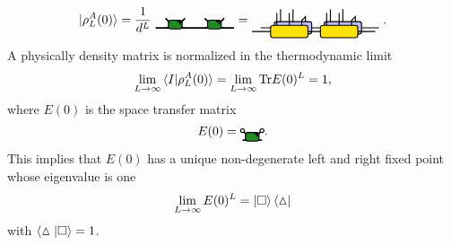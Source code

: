 \documentclass[aps,prx,twocolumn,notitlepage,nofootinbib,nobalancelastpage]{revtex4-2}
\theoremstyle{break}
\newcommand{\1}{\mathbbm{1}}
\theoremstyle{plain}
\theoremstyle{plain}
\theoremstyle{plain}
\newcommand{\MYcircle}[2]{
\draw[thick, fill=white] (#1,#2) circle (0.1cm); }
\newcommand{\rhoO}[2]{
\draw[very thick] (-.5+#1,0.5+#2) -- (#1,0+#2);
\draw[very thick] (#1,0+#2) -- (.5+#1,0.5+#2);
\draw[very thick] (-.5+#1,#2) -- (.5+#1,#2);
\draw[ thick, fill=mygreen, rounded corners=2pt] (-0.35+#1,0.2-0.25+#2) rectangle (0.35+#1,0.2+0.2+#2);
\draw[very thick] (0.1+#1,0.15+.18+#2)-- (.15+0.1+#1,0.15+.18+#2) -- (.15+0.1+#1,0+.18+#2);
}
\begin{document}
\begin{equation}
\ket{\rho_L^A(0)}=\frac{1}{d^L} \;
\begin{tikzpicture}[baseline=(current bounding box.center), scale=0.55]
\draw[very thick] (-1.0 ,0.) -- (3.0,0.);
\rhoO{0}{0}\rhoO{2}{0}
\end{tikzpicture}
=
\begin{tikzpicture}[baseline=(current  bounding  box.center), scale=.7]
\def\dx{0.15}
\def\dy{0.15}
\draw[ thick] (-4.75+.2+\dx,0.+\dy) --(-0.0+0.2+\dx,0.+\dy);
%
\draw[ thick] (-3.75+\dx,0.75+\dy) -- (-3.75+\dx,-0.0+\dy);
\draw[ thick] (-3.25+\dx,0.75+\dy) -- (-3.25+\dx,0.0+\dy);
\draw[ thick, fill=myblue, rounded corners=2pt] (-4+\dx,0.25+\dy) rectangle (-2.5+\dx,-0.25+\dy);
\draw[ thick] (-1.75+\dx,0.75+\dy) -- (-1.75+\dx,-0.0+\dy);
\draw[ thick] (-1.25+\dx,0.75+\dy) -- (-1.25+\dx,0.0+\dy);
\draw[ thick, fill=myblue, rounded corners=2pt] (-2+\dx,0.25+\dy) rectangle (-0.5+\dx,-0.25+\dy);
\draw[ thick] (-2.75 ,0.25) -- (-2.75,0.25+.2) --(-2.75+\dx,0.25+\dy+.2) --(-2.75+\dx,0.25+\dy);
\draw[ thick] (-4.75 ,0.) -- (-.0+.2,0.);
\draw[ thick] (-3.75,0.75) -- (-3.75,-0.0);
\draw[ thick] (-3.25,-0.0) -- (-3.25,0.75);
\draw[ thick, fill=myorange0, rounded corners=2pt] (-4,0.25) rectangle (-2.5,-0.25);
\draw[ thick] (-1.75,0.75) -- (-1.75,-0.0);
\draw[ thick] (-1.25,-0.0) -- (-1.25,0.75);
\draw[ thick, fill=myorange0, rounded corners=2pt] (-2,0.25) rectangle (-0.5,-0.25);
\draw[ thick] (-0.75 ,0.25) -- (-0.75,0.25+.2) --(-0.75+\dx,0.25+\dy+.2) --(-0.75+\dx,0.25+\dy);
\end{tikzpicture} \; .
\end{equation}
%
A physically density matrix is normalized in the thermodynamic limit
\begin{equation}
\lim_{L\to\infty}\braket{I|\rho_L^A(0)}=\lim_{L\to\infty}\mathrm{Tr}E(0)^L=1,
\end{equation}
where $E(0)$ is the space transfer matrix
\begin{equation}
E(0)=\begin{tikzpicture}[baseline=(current bounding box.center), scale=0.55]
\rhoO{0}{0}
\MYcircle{-0.5}{0.5}
\MYcircle{0.5}{0.5}
\end{tikzpicture}.
\end{equation}
This implies that $E(0)$ has a unique non-degenerate left and right fixed point whose eigenvalue is one 
\begin{equation}
    \lim_{L\to\infty}E(0)^L=\ket{\square}\bra{\vartriangle}\label{eq:leftrightfixedpoint}
\end{equation}
with $\braket{\vartriangle|\square}=1$.
%
\end{document}

